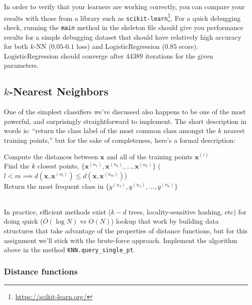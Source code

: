 \documentclass{article}
\begin{document}
In order to verify that your learners are working correctly, you can compare your results with those from a library such as \texttt{scikit-learn}\footnote{\url{https://scikit-learn.org/}}. For a quick debugging check, running the \texttt{main} method in the skeleton file should give you performance results for a simple debugging dataset that should have relatively high accuracy for both \(k\)-NN (\(0.05\)-\(0.1\) loss) and LogisticRegression (\(0.85\) score). LogisticRegression should converge after 44389 iterations for the given parameters.

\subsection*{\(k\)-Nearest Neighbors}

One of the simplest classifiers we've discussed also happens to be one of the most powerful, and surprisingly straightforward to implement. The short description in words is: ``return the class label of the most common class amongst the \(k\) nearest training points,'' but for the sake of completeness, here's a formal description:

\begin{algorithm}[H]
	\SetAlgoLined
	Compute the distances between \(\mathbf{x}\) and all of the training points \(\mathbf{x}^{(i)}\)\\
	Find the \(k\) closest points, \(\{\mathbf{x}^{(n_1)}, \mathbf{x}^{(n_2)},\ldots,\mathbf{x}^{(n_k)}\}\) (\(l<m \implies d(\mathbf{x},\mathbf{x}^{(n_l)}) \leq d(\mathbf{x},\mathbf{x}^{(n_m)})\))\\
	Return the most frequent class in \(\{y^{(n_1)},y^{(n_1)},\ldots,y^{(n_k)}\}\)\\
	~
\end{algorithm}

In practice, efficient methods exist (\(k-d\) trees, locality-sensitive hashing, etc) for doing quick (\(O(\log N)\) vs \(O(N)\)) lookup that work by building data structures that take advantage of the properties of distance functions, but for this assignment we'll stick with the brute-force approach. Implement the algorithm above in the method \texttt{KNN.query\_single\_pt}.

\subsubsection*{Distance functions}
\end{document}
